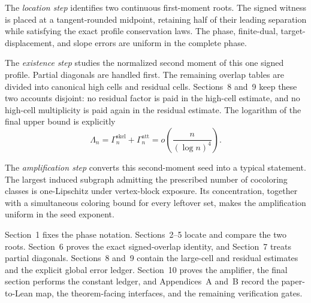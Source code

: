 The \emph{location step} identifies two continuous first-moment roots. The
signed witness is placed at a tangent-rounded midpoint, retaining half of their
leading separation while satisfying the exact profile conservation laws. The
phase, finite-dual, target-displacement, and slope errors are uniform in the
complete phase.

The \emph{existence step} studies the normalized second moment of this one
signed profile. Partial diagonals are handled first. The remaining overlap
tables are divided into canonical high cells and residual cells. Sections~8
and~9 keep these two accounts disjoint: no residual factor is paid in the
high-cell estimate, and no high-cell multiplicity is paid again in the
residual estimate. The logarithm of the final upper bound is explicitly
\[
  \Lambda_n
  =\Gamma_n^{\mathrm{skel}}+\Gamma_n^{\mathrm{att}}
  =o\!\left(\frac{n}{(\log n)^4}\right).
\]

The \emph{amplification step} converts this second-moment seed into a typical
statement. The largest induced subgraph admitting the prescribed number of
cocoloring classes is one-Lipschitz under vertex-block exposure. Its
concentration, together with a simultaneous coloring bound for every leftover
set, makes the amplification uniform in the seed exponent.

Section~1 fixes the phase notation. Sections~2--5 locate and compare the two
roots. Section~6 proves the exact signed-overlap identity, and Section~7 treats
partial diagonals. Sections~8 and~9 contain the large-cell and residual
estimates and the explicit global error ledger. Section~10 proves the
amplifier, the final section performs the constant ledger, and Appendices~A
and~B record the paper-to-Lean map, the theorem-facing interfaces, and the
remaining verification gates.